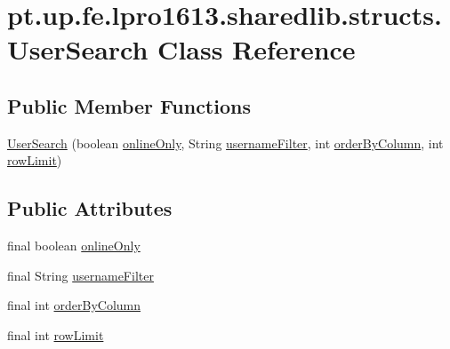 \hypertarget{classpt_1_1up_1_1fe_1_1lpro1613_1_1sharedlib_1_1structs_1_1_user_search}{}\section{pt.\+up.\+fe.\+lpro1613.\+sharedlib.\+structs.\+User\+Search Class Reference}
\label{classpt_1_1up_1_1fe_1_1lpro1613_1_1sharedlib_1_1structs_1_1_user_search}
\subsection*{Public Member Functions}
\begin{DoxyCompactItemize}
\item 
\hyperlink{classpt_1_1up_1_1fe_1_1lpro1613_1_1sharedlib_1_1structs_1_1_user_search_aa6926beb7f6930d9eb5413ee860d50e3}{User\+Search} (boolean \hyperlink{classpt_1_1up_1_1fe_1_1lpro1613_1_1sharedlib_1_1structs_1_1_user_search_a6fd03f781a5566c3e43a48230ab69681}{online\+Only}, String \hyperlink{classpt_1_1up_1_1fe_1_1lpro1613_1_1sharedlib_1_1structs_1_1_user_search_adf37317dd0f8e847ab2500c5a6e71beb}{username\+Filter}, int \hyperlink{classpt_1_1up_1_1fe_1_1lpro1613_1_1sharedlib_1_1structs_1_1_user_search_a09babcb3b1d4613f77423c0564d105d4}{order\+By\+Column}, int \hyperlink{classpt_1_1up_1_1fe_1_1lpro1613_1_1sharedlib_1_1structs_1_1_user_search_a8bcfdc0e6dfb51656d1fd6f61ee78295}{row\+Limit})
\end{DoxyCompactItemize}
\subsection*{Public Attributes}
\begin{DoxyCompactItemize}
\item 
final boolean \hyperlink{classpt_1_1up_1_1fe_1_1lpro1613_1_1sharedlib_1_1structs_1_1_user_search_a6fd03f781a5566c3e43a48230ab69681}{online\+Only}
\item 
final String \hyperlink{classpt_1_1up_1_1fe_1_1lpro1613_1_1sharedlib_1_1structs_1_1_user_search_adf37317dd0f8e847ab2500c5a6e71beb}{username\+Filter}
\item 
final int \hyperlink{classpt_1_1up_1_1fe_1_1lpro1613_1_1sharedlib_1_1structs_1_1_user_search_a09babcb3b1d4613f77423c0564d105d4}{order\+By\+Column}
\item 
final int \hyperlink{classpt_1_1up_1_1fe_1_1lpro1613_1_1sharedlib_1_1structs_1_1_user_search_a8bcfdc0e6dfb51656d1fd6f61ee78295}{row\+Limit}
\end{DoxyCompactItemize}


